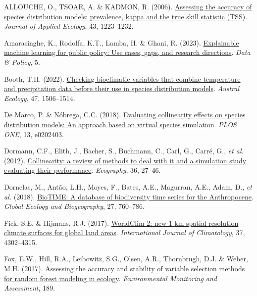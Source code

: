 \documentclass[
  letterpaper,
]{scrbook}
\newlength{\cslhangindent}
\newenvironment{CSLReferences}[2] %
 {\begin{list}{}{%
  \setlength{\itemindent}{0pt}
  \setlength{\leftmargin}{0pt}
  \setlength{\parsep}{0pt}
  \ifodd #1
   \setlength{\leftmargin}{\cslhangindent}
   \setlength{\itemindent}{-1\cslhangindent}
  \fi
  \setlength{\itemsep}{#2\baselineskip}}}
 {\end{list}}
\begin{document}
\label{refs-6}
\begin{CSLReferences}{1}{0}
ALLOUCHE, O., TSOAR, A. \& KADMON, R. (2006).
\href{https://doi.org/10.1111/j.1365-2664.2006.01214.x}{Assessing the
accuracy of species distribution models: prevalence, kappa and the true
skill statistic (TSS)}. \emph{Journal of Applied Ecology}, 43,
1223--1232.

Amarasinghe, K., Rodolfa, K.T., Lamba, H. \& Ghani, R. (2023).
\href{https://doi.org/10.1017/dap.2023.2}{Explainable machine learning
for public policy: Use cases, gaps, and research directions}. \emph{Data
\& Policy}, 5.

Booth, T.H. (2022). \href{https://doi.org/10.1111/aec.13234}{Checking
bioclimatic variables that combine temperature and precipitation data
before their use in species distribution models}. \emph{Austral
Ecology}, 47, 1506--1514.

De Marco, P. \& Nóbrega, C.C. (2018).
\href{https://doi.org/10.1371/journal.pone.0202403}{Evaluating
collinearity effects on species distribution models: An approach based
on virtual species simulation}. \emph{PLOS ONE}, 13, e0202403.

Dormann, C.F., Elith, J., Bacher, S., Buchmann, C., Carl, G., Carré, G.,
\emph{et al.} (2012).
\href{https://doi.org/10.1111/j.1600-0587.2012.07348.x}{Collinearity: a
review of methods to deal with it and a simulation study evaluating
their performance}. \emph{Ecography}, 36, 27--46.

Dornelas, M., Antão, L.H., Moyes, F., Bates, A.E., Magurran, A.E., Adam,
D., \emph{et al.} (2018).
\href{https://doi.org/10.1111/geb.12729}{BioTIME: A database of
biodiversity time series for the Anthropocene}. \emph{Global Ecology and
Biogeography}, 27, 760--786.

Fick, S.E. \& Hijmans, R.J. (2017).
\href{https://doi.org/10.1002/joc.5086}{WorldClim 2: new 1{-}km spatial
resolution climate surfaces for global land areas}. \emph{International
Journal of Climatology}, 37, 4302--4315.

Fox, E.W., Hill, R.A., Leibowitz, S.G., Olsen, A.R., Thornbrugh, D.J. \&
Weber, M.H. (2017).
\href{https://doi.org/10.1007/s10661-017-6025-0}{Assessing the accuracy
and stability of variable selection methods for random forest modeling
in ecology}. \emph{Environmental Monitoring and Assessment}, 189.


\end{CSLReferences}
\end{document}
